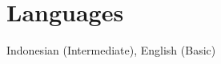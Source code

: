 \section{Languages}

\begin{onecolentry}
	Indonesian (Intermediate), English (Basic)
\end{onecolentry}
